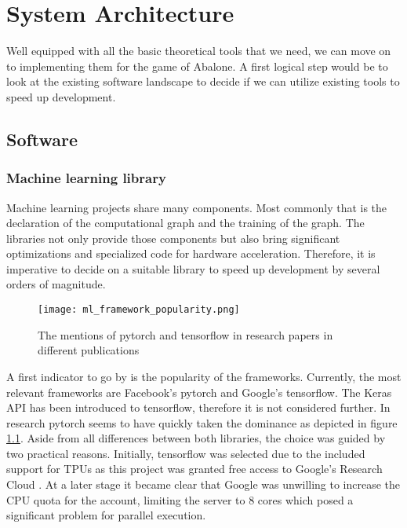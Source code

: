 \chapter{System Architecture}
\label{system-architecture}
Well equipped with all the basic theoretical tools that we need, we can move on to implementing them for the game of Abalone. A first logical step would be to look at the existing software landscape to decide if we can utilize existing tools to speed up development.

\section{Software}
\subsection{Machine learning library}
Machine learning projects share many components. Most commonly that is the declaration of the computational graph and the training of the graph. The libraries not only provide those components but also bring significant optimizations and specialized code for hardware acceleration. Therefore, it is imperative to decide on a suitable library to speed up development by several orders of magnitude.

\begin{figure}
    \centering
    \texttt{[image: ml\_framework\_popularity.png]}
    \caption{The mentions of pytorch and tensorflow in research papers in different publications \cite{noauthor_state_2019}}
    \label{ml_framework_popularity}
\end{figure}

A first indicator to go by is the popularity of the frameworks. Currently, the most relevant frameworks are Facebook's pytorch and Google's tensorflow. The Keras API has been introduced to tensorflow, therefore it is not considered further. In research pytorch seems to have quickly taken the dominance as depicted in figure \ref{ml_framework_popularity}. Aside from all differences between both libraries, the choice was guided by two practical reasons. Initially, tensorflow was selected due to the included support for TPUs as this project was granted free access to Google's Research Cloud \cite{noauthor_tpu_nodate}. At a later stage it became clear that Google was unwilling to increase the CPU quota for the account, limiting the server to 8 cores which posed a significant problem for parallel execution.

